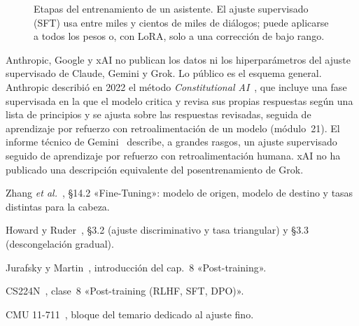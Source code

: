 \begin{figure}[h]
\centering
{}
\caption{Etapas del entrenamiento de un asistente. El ajuste supervisado (SFT) usa entre miles y cientos de miles de diálogos; puede aplicarse a todos los pesos o, con LoRA, solo a una corrección de bajo rango.}
\label{fig:posentrenamiento}
\end{figure}

\begin{observacion}
Anthropic, Google y xAI no publican los datos ni los hiperparámetros del ajuste supervisado de Claude, Gemini y Grok. Lo público es el esquema general. Anthropic describió en 2022 el método \emph{Constitutional AI}~\cite{bai-cai}, que incluye una fase supervisada en la que el modelo critica y revisa sus propias respuestas según una lista de principios y se ajusta sobre las respuestas revisadas, seguida de aprendizaje por refuerzo con retroalimentación de un modelo (módulo~21). El informe técnico de Gemini~\cite[§6.3]{gemini} describe, a grandes rasgos, un ajuste supervisado seguido de aprendizaje por refuerzo con retroalimentación humana. xAI no ha publicado una descripción equivalente del posentrenamiento de Grok.
\end{observacion}

\begin{lecturas}
\item Zhang \emph{et al.}~\cite{d2l}, §14.2 «Fine-Tuning»: modelo de origen, modelo de destino y tasas distintas para la cabeza.
\item Howard y Ruder~\cite{howard-ruder}, §3.2 (ajuste discriminativo y tasa triangular) y §3.3 (descongelación gradual).
\item Jurafsky y Martin~\cite{jm3}, introducción del cap.~8 «Post-training».
\item CS224N~\cite{cs224n}, clase~8 «Post-training (RLHF, SFT, DPO)».
\item CMU 11-711~\cite{cmu711}, bloque del temario dedicado al ajuste fino.
\end{lecturas}

